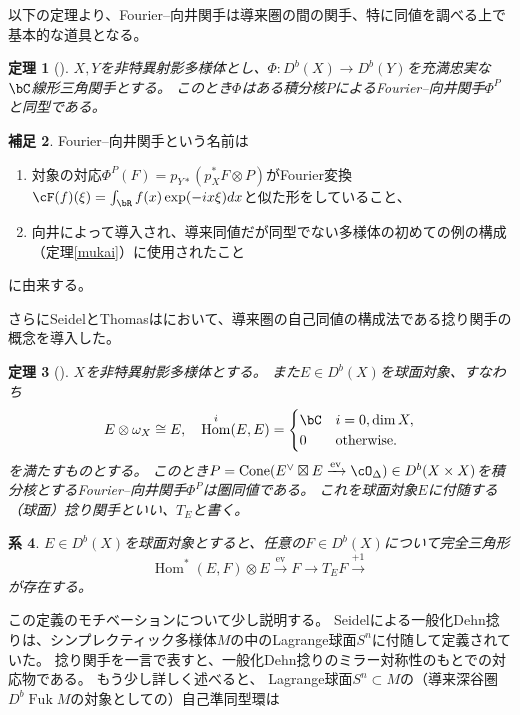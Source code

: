 \documentclass[uplatex,a4paper,dvipdfmx]{jsarticle}
\theoremstyle{plain}
\newtheorem{theorem}{定理}[section]
\newtheorem{corollary}[theorem]{系}
\theoremstyle{definition}
\newtheorem{remark}[theorem]{補足}
\DeclareMathOperator{\Hom}{\mathrm{Hom}}
\DeclareMathOperator{\Cone}{\mathrm{Cone}}
\DeclareMathOperator{\ev}{\mathrm{ev}}
\DeclareMathOperator{\Fuk}{Fuk}
\begin{document}
以下の定理より、Fourier--向井関手は導来圏の間の関手、特に同値を調べる上で基本的な道具となる。
\begin{theorem}[\cite{MR1465519}]
	$X, Y$を非特異射影多様体とし、$\Phi \colon D^b(X) \to D^b(Y)$を充満忠実な$\bC$線形三角関手とする。
	このとき$\Phi$はある積分核$P$によるFourier--向井関手$\Phi^P$と同型である。
\end{theorem}
\begin{remark}
	Fourier--向井関手という名前は
	\begin{enumerate}
		\item 対象の対応$\Phi^P(F) = p_{Y*}(p_X^*F \otimes P)$がFourier変換$\cF(f)(\xi) = \int_\bR f(x)\exp(-ix\xi)dx$と似た形をしていること、
		\item 向井\cite{MR607081}によって導入され、導来同値だが同型でない多様体の初めての例の構成（定理\ref{mukai}）に使用されたこと
	\end{enumerate}
	に由来する。
\end{remark}
さらにSeidelとThomasは\cite{MR1831820}において、導来圏の自己同値の構成法である捻り関手の概念を導入した。
\begin{theorem}[\cite{MR1831820}]
	$X$を非特異射影多様体とする。
	また$E \in D^b(X)$を球面対象、すなわち\begin{equation}
		E \otimes \omega_X \cong E,\quad \Hom^i(E, E) = \begin{cases}
			\bC & i = 0, \dim X,    \\
			0   & \text{otherwise.}
		\end{cases}
	\end{equation}を満たすものとする。
	このとき$P = \Cone(E^\vee \boxtimes E \xrightarrow{\ev} \cO_\Delta) \in D^b(X \times X)$を積分核とするFourier--向井関手$\Phi^P$は圏同値である。
	これを球面対象$E$に付随する（球面）捻り関手といい、$T_E$と書く。
\end{theorem}
\begin{corollary}
	$E \in D^b(X)$を球面対象とすると、任意の$F \in D^b(X)$について完全三角形
	\begin{equation}\label{eq:twist}
		\Hom^*(E, F) \otimes E \xrightarrow{\ev} F \to T_E F \xrightarrow{+1}
	\end{equation}
	が存在する。
\end{corollary}
この定義のモチベーションについて少し説明する。
Seidelによる一般化Dehn捻り\cite{MR1743463}は、シンプレクティック多様体$M$の中のLagrange球面$S^n$に付随して定義されていた。
捻り関手を一言で表すと、一般化Dehn捻りのミラー対称性のもとでの対応物である。
もう少し詳しく述べると、
Lagrange球面$S^n \subset M$の（導来深谷圏$D^b\Fuk M$の対象としての）自己準同型環は
\end{document}
